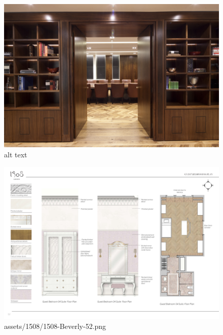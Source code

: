 \documentclass[
]{article}
\begin{document}
\begin{figure}[H]

{\centering \includegraphics{assets/1508/1508-London-Joinery.jpg}

}

\caption{alt text}

\end{figure}%
\begin{figure}[H]

{\centering \includegraphics{assets/1508/1508-Beverly-52.png}

}

\caption{assets/1508/1508-Beverly-52.png}

\end{figure}%
\end{document}

